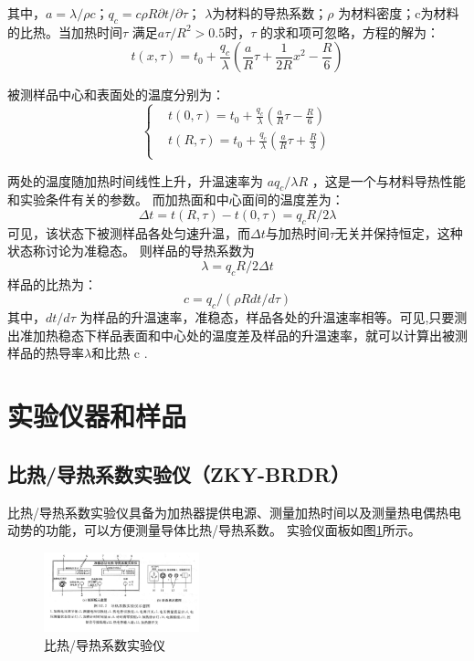 \documentclass[10pt,a4paper,twocolumn,twoside,UTF8]{ctexart}
\begin{document}
    其中，$a=\lambda/\rho c$；$q_c=c \rho R\partial t/\partial \tau$；
	$\lambda$为材料的导热系数；$\rho$ 为材料密度；c为材料的比热。当加热时间$\tau$ 满足$a\tau/R^2>0.5$时，$\tau$ 的求和项可忽略，方程的解为：
	\begin{equation*}
		t(x,\tau)=t_0+\frac{q_c}{\lambda}\left(\frac{a}{R}\tau+\frac{1}{2R}x^2-\frac{R}{6}\right)
	\end{equation*}

	被测样品中心和表面处的温度分别为：
	\[\left\{%
	\begin{aligned}
	&t(0,\tau)=t_0+\frac{q_c}{\lambda}\left(\frac{a}{R}\tau-\frac{R}{6}\right)\\
	&t(R,\tau)=t_0+\frac{q_c}{\lambda}\left(\frac{a}{R}\tau+\frac{R}{3}\right)\\
	\end{aligned}
	\right.
	\]

	两处的温度随加热时间线性上升，升温速率为 $a q_c / \lambda R$ ，这是一个与材料导热性能和实验条件有关的参数。
	而加热面和中心面间的温度差为：
	\begin{equation*}
		\varDelta t=t(R,\tau)-t(0,\tau)=q_c R/2 \lambda
	\end{equation*}
	可见，该状态下被测样品各处匀速升温，而$\varDelta t$与加热时间$\tau$无关并保持恒定，这种状态称讨论为准稳态。
	则样品的导热系数为
	\begin{equation*}
		\lambda=q_c R/2\varDelta t
	\end{equation*}
	样品的比热为：
	\begin{equation*}
		c=q_c/(\rho R dt/d\tau)
	\end{equation*}
    其中，$dt/d\tau$ 为样品的升温速率，准稳态，样品各处的升温速率相等。可见,只要测出准加热稳态下样品表面和中心处的温度差及样品的升温速率，就可以计算出被测样品的热导率$\lambda$和比热 c .

	\section{实验仪器和样品}
    \subsection{比热/导热系数实验仪（ZKY-BRDR）}
	比热/导热系数实验仪具备为加热器提供电源、测量加热时间以及测量热电偶热电动势的功能，可以方便测量导体比热/导热系数。
	实验仪面板如图\ref{fig:illus-2}所示。
	\begin{figure}[!h]
        \centering
        \includegraphics[width=0.4\textwidth]{img//2.jpg}
        \caption{比热/导热系数实验仪}
        \label{fig:illus-2}
    \end{figure}
	
\end{document}
